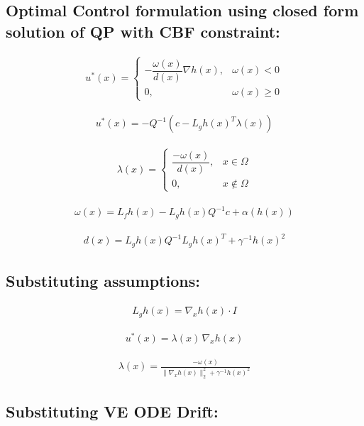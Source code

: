 \documentclass{article}
\begin{document}
\subsection{Optimal Control formulation using closed form solution of QP with CBF constraint:}

\begin{align}
u^*(x) =
\begin{cases}
-\dfrac{\omega(x)}{d(x)} \nabla h(x), & \omega(x) < 0 \\
0, & \omega(x) \ge 0
\end{cases}
\end{align}

\begin{align}
u^*(x)
=
- Q^{-1}
\left(
c - L_g h(x)^T \lambda(x)
\right)
\end{align}

\begin{align}
\lambda(x) =
\begin{cases}
\dfrac{-\omega(x)}{d(x)}, & x \in \Omega \\
0, & x \notin \Omega
\end{cases}
\end{align}

\begin{align}
\omega(x) =
L_f h(x)
-
L_g h(x) Q^{-1} c
+
\alpha(h(x))
\end{align}

\begin{align}
d(x)
=
L_g h(x) Q^{-1} L_g h(x)^T
+
\gamma^{-1} h(x)^2
\end{align}

\subsection{Substituting assumptions:}
\begin{align}
L_g h(x) = \nabla_x h(x) \cdot I
\end{align}

\begin{align}
u^*(x)
=
\lambda(x)\,\nabla_x h(x)
\end{align}

\begin{align}
\lambda(x)
=
\frac{-\omega(x)}
{\|\nabla_x h(x)\|_2^2 + \gamma^{-1}h(x)^2}
\end{align}

\subsection{Substituting VE ODE Drift:}
\end{document}
